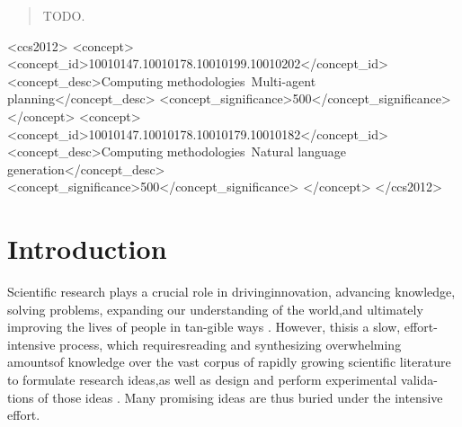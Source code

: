 \documentclass[manuscript,review,anonymous]{acmart}
\begin{document}
\begin{abstract}
TODO.
\end{abstract}

\begin{CCSXML}
<ccs2012>
   <concept>
       <concept_id>10010147.10010178.10010199.10010202</concept_id>
       <concept_desc>Computing methodologies~Multi-agent planning</concept_desc>
       <concept_significance>500</concept_significance>
       </concept>
   <concept>
       <concept_id>10010147.10010178.10010179.10010182</concept_id>
       <concept_desc>Computing methodologies~Natural language generation</concept_desc>
       <concept_significance>500</concept_significance>
       </concept>
 </ccs2012>
\end{CCSXML}




\maketitle

\section{Introduction}
Scientific research plays a crucial role in drivinginnovation, advancing knowledge, solving problems, expanding our understanding of the world,and ultimately improving the lives of people in tan-gible ways \cite{wang2023scientific}. However, thisis a slow, effort-intensive process, which requiresreading and synthesizing overwhelming amountsof knowledge over the vast corpus of rapidly growing scientific literature to formulate research ideas,as well as design and perform experimental valida-tions of those ideas \cite{hope2023computational}. Many promising ideas are thus buried under the intensive effort.
\end{document}
